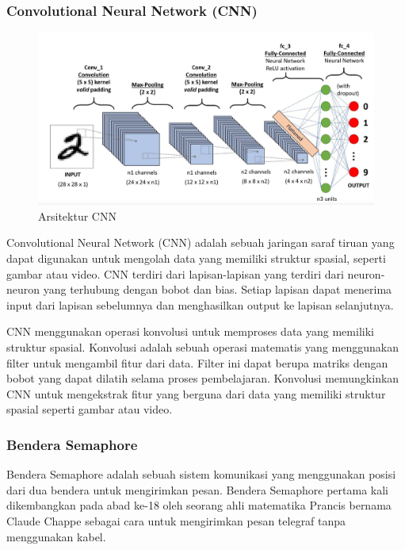 \subsubsection{Convolutional Neural Network (CNN)}
\begin{figure} [ht] \centering
  \includegraphics[scale=0.5]{gambar/arsitekturCNN.png}
  \caption{Arsitektur CNN}
  \label{fig:Ujicoba Sementara}
\end{figure}
Convolutional Neural Network (CNN) adalah sebuah jaringan saraf tiruan yang dapat digunakan untuk mengolah data yang memiliki struktur spasial, seperti gambar atau video. CNN terdiri dari lapisan-lapisan yang terdiri dari neuron-neuron yang terhubung dengan bobot dan bias. Setiap lapisan dapat menerima input dari lapisan sebelumnya dan menghasilkan output ke lapisan selanjutnya.

CNN menggunakan operasi konvolusi untuk memproses data yang memiliki struktur spasial. Konvolusi adalah sebuah operasi matematis yang menggunakan filter untuk mengambil fitur dari data. Filter ini dapat berupa matriks dengan bobot yang dapat dilatih selama proses pembelajaran. Konvolusi memungkinkan CNN untuk mengekstrak fitur yang berguna dari data yang memiliki struktur spasial seperti gambar atau video.

\subsubsection{Bendera Semaphore}
Bendera Semaphore adalah sebuah sistem komunikasi yang menggunakan posisi dari dua bendera untuk mengirimkan pesan. Bendera Semaphore pertama kali dikembangkan pada abad ke-18 oleh seorang ahli matematika Prancis bernama Claude Chappe sebagai cara untuk mengirimkan pesan telegraf tanpa menggunakan kabel.

